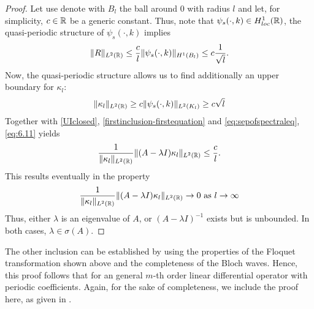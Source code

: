 \begin{theorem}
\begin{proof}
		Let use denote with $B_{l}$ the ball around $0$ with radius $l$ and let, for simplicity, $c \in \mathbb{R}$ be a generic constant. Thus, note that $\psi_{s}(\cdot, k) \in H^{1}_{loc}(\mathbb{R})$, the quasi-periodic structure of $\psi_{s}(\cdot, k)$ implies
		\begin{equation}
			 \| R \|_{L^{2}(\mathbb{R})} \leq \frac{c}{l} \| \psi_{s}(\cdot, k) \|_{H^{1}(B_{l})} \leq c \frac{1}{\sqrt{l}}. \label{eq:estimofR}
		\end{equation}
		Now, the quasi-periodic structure allows us to find additionally an upper boundary for $\kappa_{l}$:
		\begin{equation}
			\| \kappa_{l} \|_{L^{2}(\mathbb{R})} \geq c \| \psi_{s}(\cdot, k) \|_{L^{2}(K_{l})} \geq c \sqrt{l} \label{eq:6.11}
		\end{equation} 
		Together with \eqref{UIclosed}, \eqref{firstinclusion-firstequation} and \eqref{eq:sepofspectraleq}, \eqref{eq:6.11} yields
		\[ \frac{1}{\|\kappa_{l}\|_{L^{2}(\mathbb{R})}}\| (A - \lambda I) \kappa_{l} \|_{L^{2}(\mathbb{R})} \leq \frac{c}{l}. \]
		This results eventually in the property
			\[ \frac{1}{\|\kappa_{l} \|_{L^{2}(\mathbb{R})}} \| (A - \lambda I) \kappa_{l} \|_{L^{2}(\mathbb{R})} \rightarrow 0 \text{ as } l \rightarrow \infty \]
		Thus, either $\lambda$ is an eigenvalue of $A$, or $(A - \lambda I)^{-1}$ exists but is unbounded. In both cases, $\lambda \in \sigma(A)$.
	\end{proof}
\end{theorem}	

The other inclusion can be established by using the properties of the Floquet transformation shown above and the completeness of the Bloch waves. Hence, this proof follows that for an general $m$-th order linear differential operator with periodic coefficients. Again, for the sake of completeness, we include the proof here, as given in \cite[Section 3.6]{dorfler2011photonic}.

